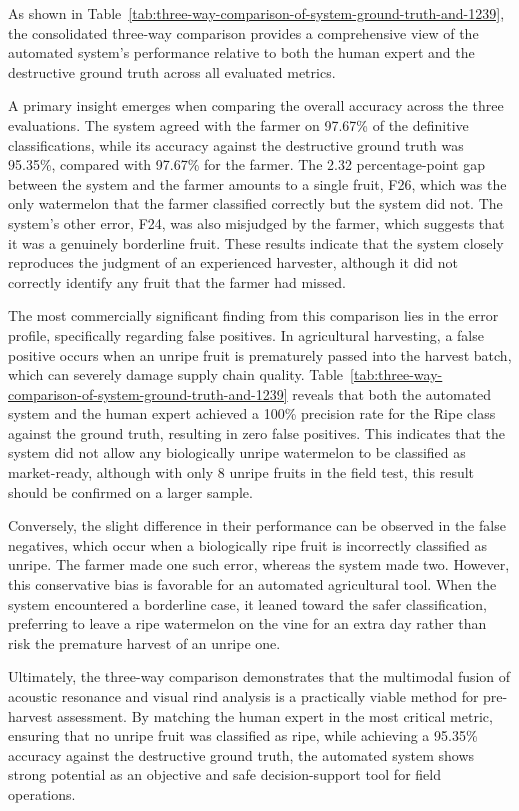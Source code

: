 \begin{thesisprose}
As shown in Table~\ref{tab:three-way-comparison-of-system-ground-truth-and-1239}, the consolidated three-way comparison provides a comprehensive view of the automated system's performance relative to both the human expert and the destructive ground truth across all evaluated metrics.

A primary insight emerges when comparing the overall accuracy across the three evaluations. The system agreed with the farmer on 97.67\% of the definitive classifications, while its accuracy against the destructive ground truth was 95.35\%, compared with 97.67\% for the farmer. The 2.32 percentage-point gap between the system and the farmer amounts to a single fruit, F26, which was the only watermelon that the farmer classified correctly but the system did not. The system's other error, F24, was also misjudged by the farmer, which suggests that it was a genuinely borderline fruit. These results indicate that the system closely reproduces the judgment of an experienced harvester, although it did not correctly identify any fruit that the farmer had missed.

The most commercially significant finding from this comparison lies in the error profile, specifically regarding false positives. In agricultural harvesting, a false positive occurs when an unripe fruit is prematurely passed into the harvest batch, which can severely damage supply chain quality. Table~\ref{tab:three-way-comparison-of-system-ground-truth-and-1239} reveals that both the automated system and the human expert achieved a 100\% precision rate for the Ripe class against the ground truth, resulting in zero false positives. This indicates that the system did not allow any biologically unripe watermelon to be classified as market-ready, although with only 8 unripe fruits in the field test, this result should be confirmed on a larger sample.

Conversely, the slight difference in their performance can be observed in the false negatives, which occur when a biologically ripe fruit is incorrectly classified as unripe. The farmer made one such error, whereas the system made two. However, this conservative bias is favorable for an automated agricultural tool. When the system encountered a borderline case, it leaned toward the safer classification, preferring to leave a ripe watermelon on the vine for an extra day rather than risk the premature harvest of an unripe one.

Ultimately, the three-way comparison demonstrates that the multimodal fusion of acoustic resonance and visual rind analysis is a practically viable method for pre-harvest assessment. By matching the human expert in the most critical metric, ensuring that no unripe fruit was classified as ripe, while achieving a 95.35\% accuracy against the destructive ground truth, the automated system shows strong potential as an objective and safe decision-support tool for field operations.


\end{thesisprose}
